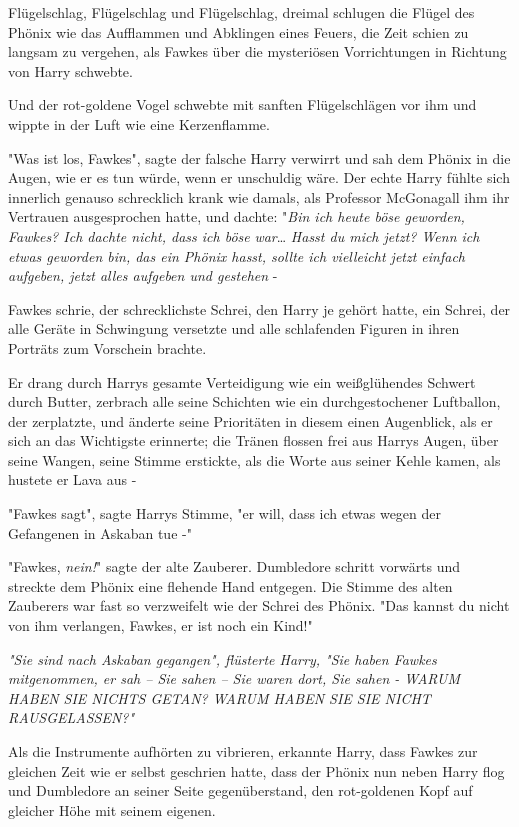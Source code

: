 {Flügelschlag, Flügelschlag und Flügelschlag, dreimal schlugen die Flügel des Phönix wie das Aufflammen und Abklingen eines Feuers, die Zeit schien zu langsam zu vergehen, als Fawkes über die mysteriösen Vorrichtungen in Richtung von Harry schwebte.

Und der rot-goldene Vogel schwebte mit sanften Flügelschlägen vor ihm und wippte in der Luft wie eine Kerzenflamme.

"Was ist los, Fawkes", sagte der falsche Harry verwirrt und sah dem Phönix in die Augen, wie er es tun würde, wenn er unschuldig wäre. Der echte Harry fühlte sich innerlich genauso schrecklich krank wie damals, als Professor McGonagall ihm ihr Vertrauen ausgesprochen hatte, und dachte: "\emph{Bin ich heute böse geworden, Fawkes? Ich dachte nicht, dass ich böse} \emph{war}… \emph{Hasst du mich jetzt? Wenn ich etwas geworden bin, das ein Phönix hasst, sollte ich vielleicht jetzt einfach aufgeben, jetzt alles aufgeben und gestehen} -

Fawkes schrie, der schrecklichste Schrei, den Harry je gehört hatte, ein Schrei, der alle Geräte in Schwingung versetzte und alle schlafenden Figuren in ihren Porträts zum Vorschein brachte.

Er drang durch Harrys gesamte Verteidigung wie ein weißglühendes Schwert durch Butter, zerbrach alle seine Schichten wie ein durchgestochener Luftballon, der zerplatzte, und änderte seine Prioritäten in diesem einen Augenblick, als er sich an das Wichtigste erinnerte; die Tränen flossen frei aus Harrys Augen, über seine Wangen, seine Stimme erstickte, als die Worte aus seiner Kehle kamen, als hustete er Lava aus -

"Fawkes sagt", sagte Harrys Stimme, "er will, dass ich etwas wegen der Gefangenen in Askaban tue -"

"Fawkes, \emph{nein!}" sagte der alte Zauberer. Dumbledore schritt vorwärts und streckte dem Phönix eine flehende Hand entgegen. Die Stimme des alten Zauberers war fast so verzweifelt wie der Schrei des Phönix. "Das kannst du nicht von ihm verlangen, Fawkes, er ist noch ein Kind!"

\emph{"Sie sind nach Askaban gegangen", flüsterte Harry, "Sie haben Fawkes mitgenommen, er sah -- \emph{Sie} sahen -- Sie waren \emph{dort}, Sie sahen - WARUM HABEN SIE NICHTS GETAN? WARUM HABEN SIE SIE NICHT RAUSGELASSEN?"}

Als die Instrumente aufhörten zu vibrieren, erkannte Harry, dass Fawkes zur gleichen Zeit wie er selbst geschrien hatte, dass der Phönix nun neben Harry flog und Dumbledore an seiner Seite gegenüberstand, den rot-goldenen Kopf auf gleicher Höhe mit seinem eigenen.

}
